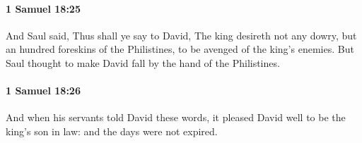 		\paragraph{1 Samuel 18:25} %
			\label{1SAMUEL-18-25}

			And Saul said, Thus shall ye say to David, The king desireth not any dowry, but an hundred foreskins of the Philistines, to be avenged of the king’s enemies. But Saul thought to make David fall by the hand of the Philistines.


		\paragraph{1 Samuel 18:26} %
			\label{1SAMUEL-18-26}

			And when his servants told David these words, it pleased David well to be the king’s son in law: and the days were not expired.


